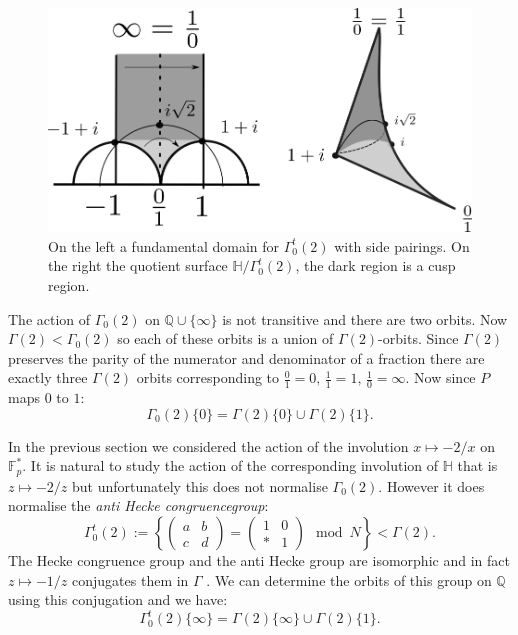 \documentclass[12pt,a4paper]{amsart}
\def\HH{\mathbb{H}}
\def\g2{\Gamma(2)}
\def\ah{\Gamma_0^t(2)}
\def\oot{\HH / \ah}
\def\QQ{\mathbb{Q}}
\begin{document}
 \begin{figure}[H]
\begin{center}
\includegraphics[scale=.5]{hecke_fund_dom.png} 
\end{center}
\caption{On the left a fundamental domain for $\ah$ with side
pairings.  On the right the quotient surface $\oot$, the dark region
is a cusp region.}
\label{fundamental domain}
\end{figure}

The action of $\Gamma_0(2)$ on $\mathbb{Q}\cup \{\infty\}$ is not
transitive and there are two orbits.
Now $\Gamma(2) < \Gamma_0(2)  $ so each of these orbits is a union of
$\Gamma(2)$-orbits.
Since $\Gamma(2)$ preserves the parity of the numerator and
denominator of a fraction there are exactly three $\Gamma(2)$ orbits
corresponding to $\frac{0}{1} = 0,\, \frac{1}{1} = 1, \,
\frac{1}{0}=\infty$.
Now since $P$ maps $0$ to $1$:
$$\Gamma_0(2) \{0\} =   \Gamma(2) \{0\} \cup \Gamma(2) \{1\}.$$

In the previous section we considered the action of the involution
$x\mapsto -2/x$ on $\mathbb{F}_{p}^*$. It is natural to study the
action of the corresponding involution of $\mathbb{H}$ that is
$z\mapsto -2/z$ but unfortunately this does not normalise
$\Gamma_0(2)$. 
However it does normalise the \textit{anti Hecke congruencegroup}:
$$ \ah := \left \{ \begin{pmatrix} a & b \\ c & d \end{pmatrix} = 
\begin{pmatrix} 1 & 0 \\ * & 1 \end{pmatrix} \mod N \right \} < \g2.$$
The Hecke congruence group and the anti Hecke group are isomorphic
and in fact $z\mapsto -1/z$ conjugates them  in $\Gamma$  .
We can determine the orbits of this group on $\QQ$ using this
conjugation and we have:
$$\ah \{\infty\} =   \Gamma(2) \{\infty\} \cup \Gamma(2) \{1\}.$$
\end{document}
